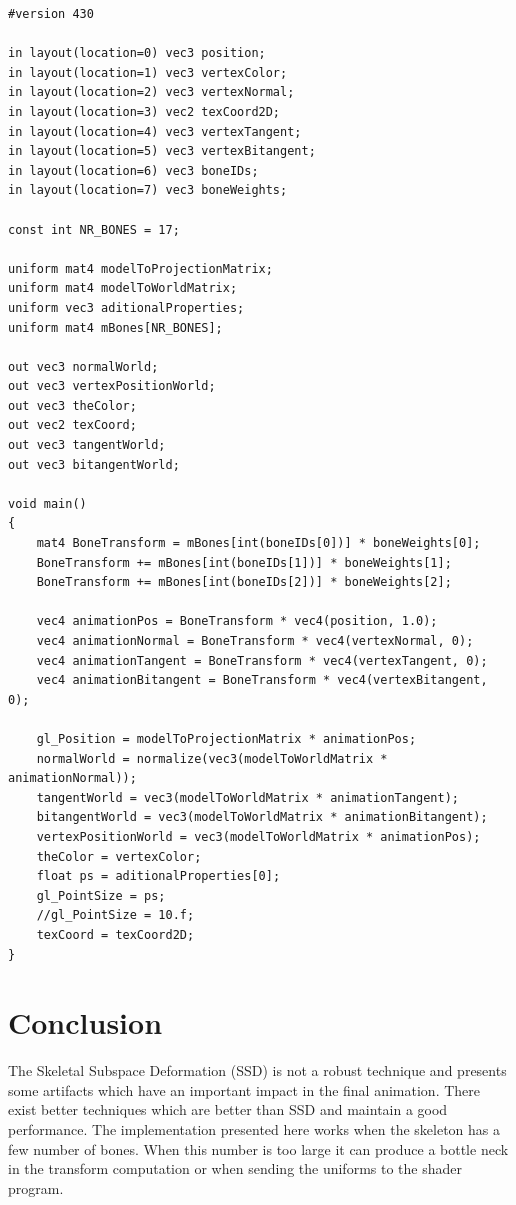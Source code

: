 \documentclass[10pt]{article} %
\begin{document}
\begin{lstlisting}[basicstyle=\footnotesize\ttfamily ,breaklines=true, frame=single]
#version 430

in layout(location=0) vec3 position;
in layout(location=1) vec3 vertexColor;
in layout(location=2) vec3 vertexNormal;
in layout(location=3) vec2 texCoord2D;
in layout(location=4) vec3 vertexTangent;
in layout(location=5) vec3 vertexBitangent;
in layout(location=6) vec3 boneIDs;
in layout(location=7) vec3 boneWeights;

const int NR_BONES = 17;

uniform mat4 modelToProjectionMatrix;
uniform mat4 modelToWorldMatrix;
uniform vec3 aditionalProperties;
uniform mat4 mBones[NR_BONES];

out vec3 normalWorld;
out vec3 vertexPositionWorld;
out vec3 theColor;
out vec2 texCoord;
out vec3 tangentWorld;
out vec3 bitangentWorld;

void main()
{
	mat4 BoneTransform = mBones[int(boneIDs[0])] * boneWeights[0];
    BoneTransform += mBones[int(boneIDs[1])] * boneWeights[1];
    BoneTransform += mBones[int(boneIDs[2])] * boneWeights[2];
	
	vec4 animationPos = BoneTransform * vec4(position, 1.0);
	vec4 animationNormal = BoneTransform * vec4(vertexNormal, 0);
	vec4 animationTangent = BoneTransform * vec4(vertexTangent, 0);
	vec4 animationBitangent = BoneTransform * vec4(vertexBitangent, 0);
	
	gl_Position = modelToProjectionMatrix * animationPos;
	normalWorld = normalize(vec3(modelToWorldMatrix * animationNormal));
	tangentWorld = vec3(modelToWorldMatrix * animationTangent);
	bitangentWorld = vec3(modelToWorldMatrix * animationBitangent);
	vertexPositionWorld = vec3(modelToWorldMatrix * animationPos);
	theColor = vertexColor;
	float ps = aditionalProperties[0];
	gl_PointSize = ps;
	//gl_PointSize = 10.f;
	texCoord = texCoord2D;
}
\end{lstlisting}

\section{Conclusion}
The Skeletal Subspace Deformation (SSD) is not a robust technique and presents some artifacts which have an important impact in the final animation. There exist better techniques which are better than SSD and maintain a good performance.
The implementation presented here works when the skeleton has a few number of bones. When this number is too large it can produce a bottle neck in the transform computation or when sending the uniforms to the shader program.



\end{document}
